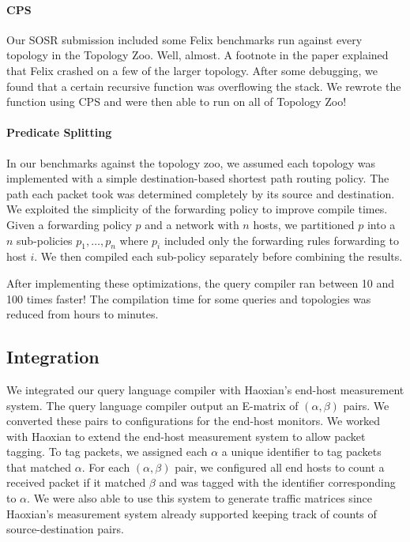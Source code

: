 \documentclass{hw}
\begin{document}
\paragraph{CPS}
Our SOSR submission included some Felix benchmarks run against every topology
in the Topology Zoo. Well, almost. A footnote in the paper explained that Felix
crashed on a few of the larger topology. After some debugging, we found that a
certain recursive function was overflowing the stack. We rewrote the function
using CPS and were then able to run on all of Topology Zoo!

\paragraph{Predicate Splitting}
In our benchmarks against the topology zoo, we assumed each topology was
implemented with a simple destination-based shortest path routing policy. The
path each packet took was determined completely by its source and destination.
We exploited the simplicity of the forwarding policy to improve compile times.
Given a forwarding policy $p$ and a network with $n$ hosts, we partitioned $p$
into a $n$ sub-policies $p_1, \ldots, p_n$ where $p_i$ included only the
forwarding rules forwarding to host $i$. We then compiled each sub-policy
separately before combining the results.

After implementing these optimizations, the query compiler ran between 10 and
100 times faster! The compilation time for some queries and topologies was
reduced from hours to minutes.

\subsection{Integration}
We integrated our query language compiler with Haoxian's end-host measurement
system. The query language compiler output an E-matrix of $(\alpha, \beta)$
pairs. We converted these pairs to configurations for the end-host monitors. We
worked with Haoxian to extend the end-host measurement system to allow packet
tagging. To tag packets, we assigned each $\alpha$ a unique identifier to tag
packets that matched $\alpha$. For each $(\alpha, \beta)$ pair, we configured
all end hosts to count a received packet if it matched $\beta$ and was tagged
with the identifier corresponding to $\alpha$.  We were also able to use this
system to generate traffic matrices since Haoxian's measurement system already
supported keeping track of counts of source-destination pairs.
\end{document}
